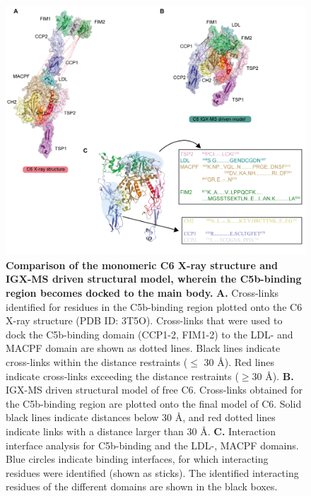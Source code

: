 \begin{subappendices}
    \begin{figure}[hbt!]
        \center
        \includegraphics[width=\textwidth]{Chapter.2/Figures/SI_Fig7.png} 
        \caption{\textbf{Comparison of the monomeric C6 X-ray structure and IGX-MS driven structural model, wherein the C5b-binding region becomes docked to the main body.} \textbf{A.} Cross-links identified for residues in the C5b-binding region plotted onto the C6 X-ray structure (PDB ID: 3T5O). Cross-links that were used to dock the C5b-binding domain (CCP1-2, FIM1-2) to the LDL- and MACPF domain are shown as dotted lines. Black lines indicate cross-links within the distance restraints ($\leq$ 30 Å). Red lines indicate cross-links exceeding the distance restraints ($\geq$30 Å). \textbf{B.} IGX-MS driven structural model of free C6. Cross-links obtained for the C5b-binding region are plotted onto the final model of C6. Solid black lines indicate distances below 30 Å, and red dotted lines indicate links with a distance larger than 30 Å. \textbf{C.} Interaction interface analysis for C5b-binding and the LDL-, MACPF domains. Blue circles indicate binding interfaces, for which interacting residues were identified (shown as sticks). The identified interacting residues of the different domains are shown in the black boxes.}
        \label{fig:ch2_app_fig8}
    \end{figure}


\end{subappendices}
